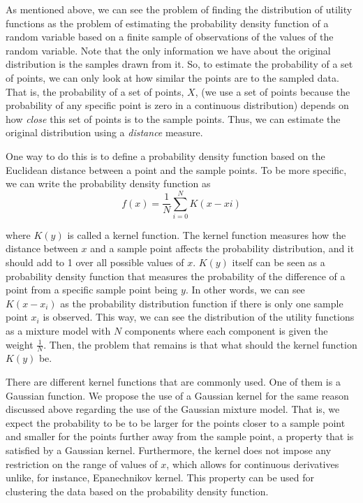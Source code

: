 As mentioned above, we can see the problem of finding the distribution of utility functions as the problem of estimating the probability density function of a random variable based on a finite sample of observations of the values of the random variable. Note that the only information we have about the original distribution is the samples drawn from it. So, to estimate the probability of a set of points, we can only look at how similar the points are to the sampled data. That is, the probability of a set of points, $X$, (we use a set of points because the probability of any specific point is zero in a continuous distribution) depends on how \textit{close} this set of points is to the sample points. Thus, we can estimate the original distribution using a \textit{distance} measure.

One way to do this is to define a probability density function based on the Euclidean distance between a point and the sample points. To be more specific, we can write the probability density function as 
\begin{equation*}
f(x) = \frac{1}{N}\sum_{i = 0}^{N}K(x - xi)	
\end{equation*}

where $K(y)$ is called a kernel function. The kernel function measures how the distance between $x$ and a sample point affects the probability distribution, and it should add to 1 over all possible values of $x$. $K(y)$ itself can be seen as a probability density function that measures the probability of the difference of a point from a specific sample point being $y$. In other words, we can see $K(x - x_i)$ as the probability distribution function if there is only one sample point $x_i$ is observed. This way, we can see the distribution of the utility functions as a mixture model with $N$ components where each component is given the weight $\frac{1}{N}$. Then, the problem that remains is that what should the kernel function $K(y)$ be. 

There are different kernel functions that are commonly used. One of them is a Gaussian function. We propose the use of a Gaussian kernel for the same reason discussed above regarding the use of the Gaussian mixture model. That is, we expect the probability to be to be larger for the points closer to a sample point and smaller for the points  further away from the sample point, a property that is satisfied by a Gaussian kernel. Furthermore, the kernel does not impose any restriction on the range of values of $x$, which allows for continuous derivatives unlike, for instance, Epanechnikov kernel. This property can be used for clustering the data based on the probability density function. 

